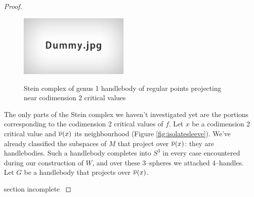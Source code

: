 \begin{proof}
	\begin{figure}
		\centering
		\captionsetup{justification=centering}
		\caption{Stein complex of genus 1 handlebody of regular points projecting near codimension 2 critical values}
		\includegraphics[height=3cm]{figures/dummy.jpg}
		\label{fig:codim2steinregular}
	\end{figure}
	
	The only parts of the Stein complex we haven't investigated yet are the portions corresponding to the codimension 2 critical values of $f$.
	Let $x$ be a codimension 2 critical value and $\overline{\nu}(x)$ its neighbourhood (Figure \ref{fig:isolatesleeve}).
	We've already classified the subspaces of $M$ that project over $\overline{\nu}(x)$: they are handlebodies.
	Such a handlebody completes into $S^3$ in every case encountered during our construction of $W$, and over these 3--spheres we attached 4--handles.
	Let $G$ be a handlebody that projects over $\overline{\nu}(x)$.
												
												
												\newpage
												{
													section incomplete
												}
												\newpage
												
											
													
													
													
													
													
													
\end{proof}
												
												
												
